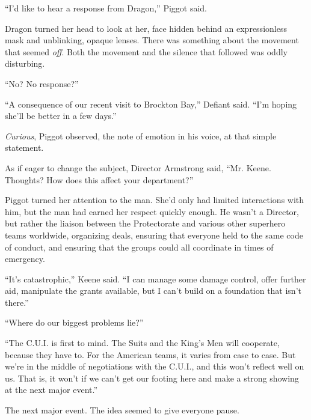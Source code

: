 ``I'd like to hear a response from Dragon,'' Piggot said.



Dragon turned her head to look at her, face hidden behind an expressionless mask and unblinking, opaque lenses.  There was something about the movement that seemed \emph{off}.  Both the movement and the silence that followed was oddly disturbing.



``No?  No response?''



``A consequence of our recent visit to Brockton Bay,'' Defiant said.  ``I'm hoping she'll be better in a few days.''



\emph{Curious}, Piggot observed, the note of emotion in his voice, at that simple statement.



As if eager to change the subject, Director Armstrong said, ``Mr. Keene.  Thoughts?  How does this affect your department?''



Piggot turned her attention to the man.  She'd only had limited interactions with him, but the man had earned her respect quickly enough.  He wasn't a Director, but rather the liaison between the Protectorate and various other superhero teams worldwide, organizing deals, ensuring that everyone held to the same code of conduct, and ensuring that the groups could all coordinate in times of emergency.



``It's catastrophic,'' Keene said.  ``I can manage some damage control, offer further aid, manipulate the grants available, but I can't build on a foundation that isn't there.''



``Where do our biggest problems lie?''



``The C.U.I. is first to mind.  The Suits and the King's Men will cooperate, because they have to.  For the American teams, it varies from case to case.  But we're in the middle of negotiations with the C.U.I., and this won't reflect well on us.  That is, it won't if we can't get our footing here and make a strong showing at the next major event.''



The next major event.  The idea seemed to give everyone pause.




